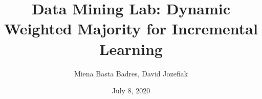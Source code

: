 \documentclass[t]{beamer}
\title{Data Mining Lab: Dynamic Weighted Majority for Incremental Learning}
\date{July 8, 2020}
\author{Miena Basta Badres, David Jozefiak}
\begin{document}

\begin{frame}
\titlepage
\end{frame}







\end{document}
